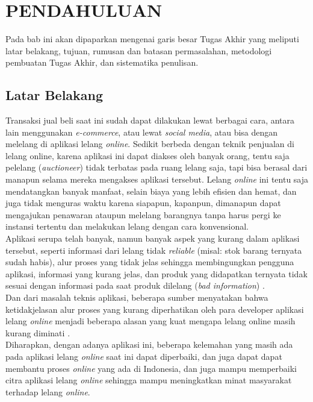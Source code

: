 \chapter{PENDAHULUAN}
  Pada bab ini akan dipaparkan mengenai garis besar Tugas Akhir yang meliputi latar belakang, tujuan, rumusan dan batasan permasalahan, metodologi pembuatan Tugas Akhir, dan sistematika penulisan.
  \section{Latar Belakang}
  	
	\indent Transaksi jual beli saat ini sudah dapat dilakukan lewat berbagai cara, antara lain menggunakan \textit{e-commerce}, atau lewat \textit{social media}, atau bisa dengan melelang di aplikasi lelang \textit{online}. Sedikit berbeda dengan teknik penjualan di lelang online, karena aplikasi ini dapat diakses oleh banyak orang, tentu saja pelelang (\textit{auctioneer}) tidak terbatas pada ruang lelang saja, tapi bisa berasal dari manapun selama mereka mengakses aplikasi tersebut.  Lelang \textit{online} ini tentu saja mendatangkan banyak manfaat, selain biaya yang lebih efisien dan hemat, dan juga tidak menguras waktu karena siapapun, kapanpun, dimanapun dapat mengajukan penawaran ataupun melelang barangnya tanpa harus pergi ke instansi tertentu dan melakukan lelang dengan cara konvensional.
    \\
    \indent Aplikasi serupa telah banyak, namun banyak aspek yang kurang dalam aplikasi tersebut, seperti informasi dari lelang tidak \textit{reliable} (misal: stok barang ternyata sudah habis), alur proses yang tidak jelas sehingga membingungkan pengguna aplikasi, informasi yang kurang jelas, dan produk yang didapatkan ternyata tidak sesuai dengan informasi pada saat produk dilelang (\textit{bad information}) \cite{ying-feng_kuo_online_2016}.
    \\
    \indent Dan dari masalah teknis aplikasi, beberapa sumber menyatakan bahwa ketidakjelasan alur proses yang kurang diperhatikan oleh para developer aplikasi lelang \textit{online} menjadi beberapa alasan yang kuat mengapa lelang online masih kurang diminati \cite{noauthor_sistem_nodate}.
    \\
	\indent Diharapkan, dengan adanya aplikasi ini, beberapa kelemahan yang masih ada pada aplikasi lelang \textit{online} saat ini dapat diperbaiki, dan juga dapat dapat membantu proses \textit{online} yang ada di Indonesia, dan juga mampu memperbaiki citra aplikasi lelang \textit{online} sehingga mampu meningkatkan minat masyarakat terhadap lelang \textit{online}.
    
